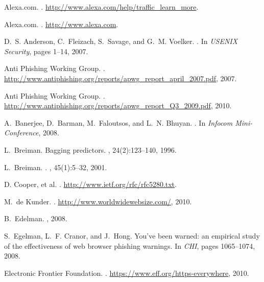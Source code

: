 \documentclass[twocolumn]{article}
\begin{document}
\small

\begin{thebibliography}{10}

Alexa.com.
.
\newblock \url{http://www.alexa.com/help/traffic_learn_more}.

{Alexa.com}.
.
\newblock \url{http://www.alexa.com}.

D.~S. Anderson, C.~Fleizach, S.~Savage, and G.~M. Voelker.
.
\newblock In {\em USENIX Security}, pages 1--14, 2007.

{Anti Phishing Working Group}.
.
\newblock \url{http://www.antiphishing.org/reports/apwg_report_april_2007.pdf},
  2007.

{Anti Phishing Working Group}.
.
\newblock \url{http://www.antiphishing.org/reports/apwg_report_Q3_2009.pdf}, 2010.

A.~Banerjee, D.~Barman, M.~Faloutsos, and L.~N. Bhuyan.
.
\newblock In {\em Infocom Mini-Conference}, 2008.

L.~Breiman.
\newblock Bagging predictors.
, 24(2):123--140, 1996.

L.~Breiman.
.
, 45(1):5--32, 2001.

{D. Cooper, et al.}
.
\newblock \url{http://www.ietf.org/rfc/rfc5280.txt}.

M.~{de Kunder}.
.
\newblock \url{http://www.worldwidewebsize.com/}, 2010.

B.~Edelman.
, 2008.

S.~Egelman, L.~F. Cranor, and J.~Hong.
\newblock You've been warned: an empirical study of the effectiveness of web
  browser phishing warnings.
\newblock In {\em CHI}, pages 1065--1074, 2008.

{Electronic Frontier Foundation}.
.
\newblock \url{https://www.eff.org/https-everywhere}, 2010.


\end{thebibliography}
\end{document}

